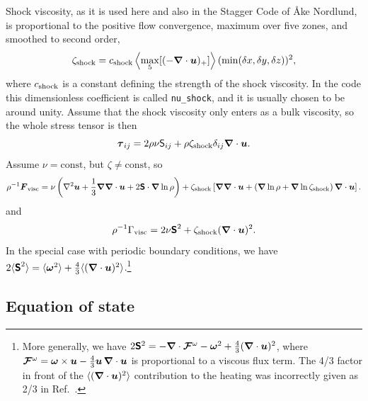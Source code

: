 \documentclass[\mydriver,12pt,twoside,notitlepage,a4paper]{article}
\newcommand{\code}[1]{\texttt{#1}}
\renewcommand{\vec}[1]{\mbox{\boldmath{$#1$}}}
\newcommand{\grad}    {\vec{\nabla}}
\newcommand{\Div}     {\vec{\nabla}\cdot}
\newcommand{\Laplace} {\nabla^2}
\newcommand{\ov}            {\vec{\omega}}
\newcommand{\uv}            {\vec{u}}
\newcommand{\omv}           {\boldsymbol{\omega}}
\newcommand{\Strain}        {\boldsymbol{\mathsf{S}}}
\newcommand{\nab}{\mbox{\boldmath $\nabla$} {}}
\newcommand{\SSSS}{\mbox{\boldmath ${\sf S}$} {}}
\newcommand{\FFF}{\mbox{\boldmath ${\cal F}$} {}}
\begin{document}
Shock viscosity, as it is used here and also in the Stagger Code of {\AA}ke Nordlund,
is proportional to the positive flow convergence, maximum over five zones, and smoothed to second order,
\begin{equation}
\zeta_{\rm shock}=c_{\rm shock}\left<\max_5[(-\Div\uv)_+]\right>(\min(\delta x,\delta y,\delta z))^2,
\end{equation}
where $c_{\rm shock}$ is a constant defining the strength of the shock viscosity.
In the code this dimensionless coefficient is called \code{nu_shock}, and it
is usually chosen to be around unity.
Assume that the shock viscosity only enters as a bulk viscosity,
so the whole stress tensor is then
\begin{equation}
\vec{\tau}_{ij}=2\rho\nu{\sf S}_{ij}+\rho\zeta_{\rm shock}\delta_{ij}\nab\cdot\uv.
\end{equation}
Assume $\nu=\mbox{const}$, but $\zeta\neq\mbox{const}$, so
\begin{equation}
\rho^{-1}\vec{F}_{\rm visc}=
\nu\left(\Laplace\uv+\frac{1}{3}\grad\Div\uv+2\Strain\cdot\grad\ln\rho\right)
+\zeta_{\rm shock}\left[\grad\Div\uv+\left(\grad\ln\rho+\grad\ln\zeta_{\rm shock}\right)\Div\uv\right].
\end{equation}
and
\begin{equation}
\rho^{-1}\Gamma_{\rm visc}=2\nu\Strain^2+\zeta_{\rm shock}(\Div\uv)^2.
\end{equation}
In the special case with periodic boundary conditions, we have
$2\langle\Strain^2\rangle=\langle\omv^2\rangle+{4\over3}\langle(\nab\cdot\uv)^2\rangle$.\footnote{
More generally, we have $2\SSSS^2=-\nab\cdot\FFF^{\omega}-\ov^2+\frac{4}{3}(\nab\cdot\uv)^2$,
where $\FFF^{\omega}=\ov\times\uv-\frac{4}{3}\uv\,\nab\cdot\uv$ is proportional to a viscous flux term.
The 4/3 factor in front of the $\langle(\nab\cdot\uv)^2\rangle$ contribution to the heating was incorrectly given as 2/3 in Ref.~\cite{BJNRST96}.}


\subsection{Equation of state}
\label{S-eos}
\end{document}
